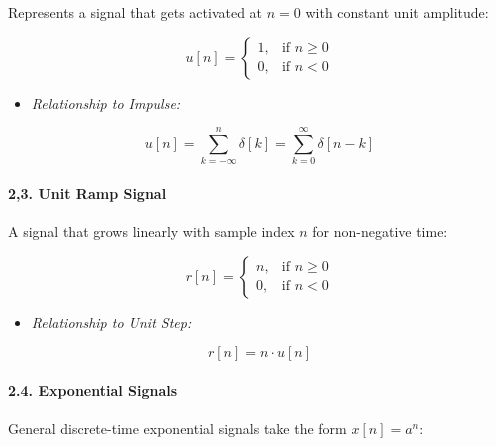 Represents a signal that gets activated at \(n = 0\) with constant unit
amplitude:

\[  
u[n] = \begin{cases} 1, & \text{if } n \ge 0 \\ 0, & \text{if } n < 0 \end{cases}  
\]

\begin{itemize}
\tightlist
\item
  \emph{Relationship to Impulse:}
\end{itemize}

\[
u[n] = \sum_{k=-\infty}^{n} \delta[k] = \sum_{k=0}^{\infty} \delta[n-k]
\]

\paragraph{2,3. Unit Ramp Signal}\label{unit-ramp-signal}

A signal that grows linearly with sample index \(n\) for non-negative
time:

\[  
r[n] = \begin{cases} n, & \text{if } n \ge 0 \\ 0, & \text{if } n < 0 \end{cases}  
\]

\begin{itemize}
\tightlist
\item
  \emph{Relationship to Unit Step:}
\end{itemize}

\[
r[n] = n \cdot u[n]
\]

\paragraph{2.4. Exponential Signals}\label{exponential-signals}

General discrete-time exponential signals take the form \(x[n] = a^n\):

